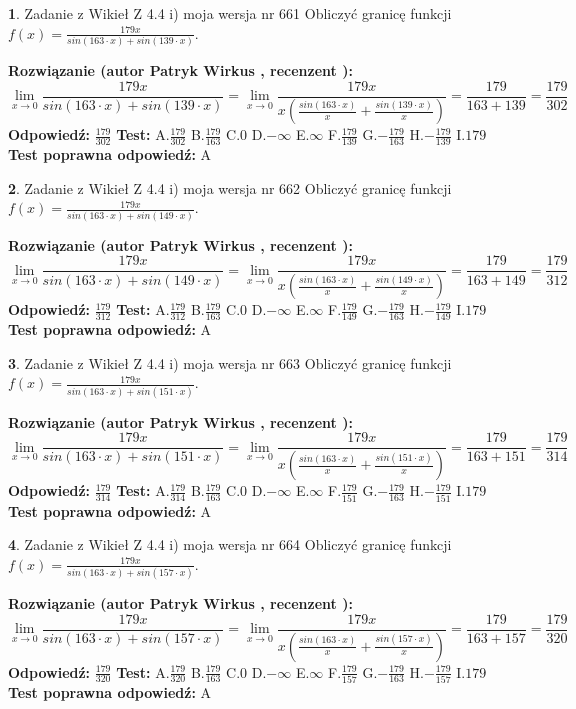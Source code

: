 \documentclass[12pt, a4paper]{article}
\theoremstyle{definition} %
\newtheorem{zad}{}
\newcommand{\zadStart}[1]{\begin{zad}#1\newline}
\newcommand{\zadStop}{\end{zad}}
\newcommand{\rozwStart}[2]{\noindent \textbf{Rozwiązanie (autor #1 , recenzent #2): }\newline}
\newcommand{\rozwStop}{\newline}
\newcommand{\odpStart}{\noindent \textbf{Odpowiedź:}\newline}
\newcommand{\odpStop}{\newline}
\newcommand{\testStart}{\noindent \textbf{Test:}\newline}
\newcommand{\testStop}{\newline}
\newcommand{\kluczStart}{\noindent \textbf{Test poprawna odpowiedź:}\newline}
\newcommand{\kluczStop}{\newline}
\begin{document}
\zadStart{Zadanie z Wikieł Z 4.4 i) moja wersja nr 661}
Obliczyć granicę funkcji $f(x)=\frac{179x}{sin(163\cdot x) +sin(139\cdot x)}$.
\zadStop
\rozwStart{Patryk Wirkus}{}
$$\lim\limits_{x\to 0}\frac{179x}{sin(163\cdot x) +sin(139\cdot x)}=\lim\limits_{x\to 0}\frac{179x}{x(\frac{sin(163\cdot x)}{x}+\frac{sin(139\cdot x)}{x})}=\frac{179}{163+139} = \frac{179}{302}$$
\rozwStop
\odpStart
$\frac{179}{302}$
\odpStop
\testStart
A.$\frac{179}{302}$
B.$\frac{179}{163}$
C.$0$
D.$-\infty$
E.$\infty$
F.$\frac{179}{139}$
G.$-\frac{179}{163}$
H.$-\frac{179}{139}$
I.$179$
\testStop
\kluczStart
A
\kluczStop



\zadStart{Zadanie z Wikieł Z 4.4 i) moja wersja nr 662}
Obliczyć granicę funkcji $f(x)=\frac{179x}{sin(163\cdot x) +sin(149\cdot x)}$.
\zadStop
\rozwStart{Patryk Wirkus}{}
$$\lim\limits_{x\to 0}\frac{179x}{sin(163\cdot x) +sin(149\cdot x)}=\lim\limits_{x\to 0}\frac{179x}{x(\frac{sin(163\cdot x)}{x}+\frac{sin(149\cdot x)}{x})}=\frac{179}{163+149} = \frac{179}{312}$$
\rozwStop
\odpStart
$\frac{179}{312}$
\odpStop
\testStart
A.$\frac{179}{312}$
B.$\frac{179}{163}$
C.$0$
D.$-\infty$
E.$\infty$
F.$\frac{179}{149}$
G.$-\frac{179}{163}$
H.$-\frac{179}{149}$
I.$179$
\testStop
\kluczStart
A
\kluczStop



\zadStart{Zadanie z Wikieł Z 4.4 i) moja wersja nr 663}
Obliczyć granicę funkcji $f(x)=\frac{179x}{sin(163\cdot x) +sin(151\cdot x)}$.
\zadStop
\rozwStart{Patryk Wirkus}{}
$$\lim\limits_{x\to 0}\frac{179x}{sin(163\cdot x) +sin(151\cdot x)}=\lim\limits_{x\to 0}\frac{179x}{x(\frac{sin(163\cdot x)}{x}+\frac{sin(151\cdot x)}{x})}=\frac{179}{163+151} = \frac{179}{314}$$
\rozwStop
\odpStart
$\frac{179}{314}$
\odpStop
\testStart
A.$\frac{179}{314}$
B.$\frac{179}{163}$
C.$0$
D.$-\infty$
E.$\infty$
F.$\frac{179}{151}$
G.$-\frac{179}{163}$
H.$-\frac{179}{151}$
I.$179$
\testStop
\kluczStart
A
\kluczStop



\zadStart{Zadanie z Wikieł Z 4.4 i) moja wersja nr 664}
Obliczyć granicę funkcji $f(x)=\frac{179x}{sin(163\cdot x) +sin(157\cdot x)}$.
\zadStop
\rozwStart{Patryk Wirkus}{}
$$\lim\limits_{x\to 0}\frac{179x}{sin(163\cdot x) +sin(157\cdot x)}=\lim\limits_{x\to 0}\frac{179x}{x(\frac{sin(163\cdot x)}{x}+\frac{sin(157\cdot x)}{x})}=\frac{179}{163+157} = \frac{179}{320}$$
\rozwStop
\odpStart
$\frac{179}{320}$
\odpStop
\testStart
A.$\frac{179}{320}$
B.$\frac{179}{163}$
C.$0$
D.$-\infty$
E.$\infty$
F.$\frac{179}{157}$
G.$-\frac{179}{163}$
H.$-\frac{179}{157}$
I.$179$
\testStop
\kluczStart
A
\kluczStop
\end{document}
